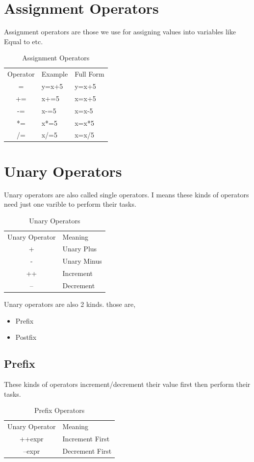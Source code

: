 \documentclass[openany]{book}  %
\begin{document}
\section{Assignment Operators}
Assignment operators\cite{Ref8} are those we use for assigning values into variables like Equal to etc.
% 
% 
\begin{table}[htbp]
    \begin{tabular}{cll}
        Operator & Example & Full Form \\
        =        & y=x+5   & y=x+5     \\
        +=       & x+=5    & x=x+5     \\
        -=       & x-=5    & x=x-5     \\
        *=       & x*=5    & x=x*5     \\
        /=       & x/=5    & x=x/5
    \end{tabular}
    \centering
    \caption{Assignment Operators}
\end{table}
% 
% 
\section{Unary Operators}
Unary operators\cite{Ref8} are also called single operators. I means these kinds of operators need just one varible to perform their tasks.
% 
% 
\begin{table}[htbp]
    \begin{tabular}{cl}
        Unary Operator & Meaning     \\
        +              & Unary Plus  \\
        -              & Unary Minus \\
        ++             & Increment   \\
        --             & Decrement
    \end{tabular}
    \centering
    \caption{Unary Operators}
\end{table}
Unary operators are also 2 kinds. those are,
\begin{itemize}
    \item Prefix
    \item Postfix
\end{itemize}
% 
% 
\subsection{Prefix}
These kinds of operators\cite{Ref8} increment/decrement their value first then perform their tasks.
% 
% 
\begin{table}[htbp]
    \begin{tabular}{cl}
        Unary Operator & Meaning         \\
        ++expr         & Increment First \\
        --expr         & Decrement First
    \end{tabular}
    \centering
    \caption{Prefix Operators}
\end{table}
% 
% 
\end{document}
